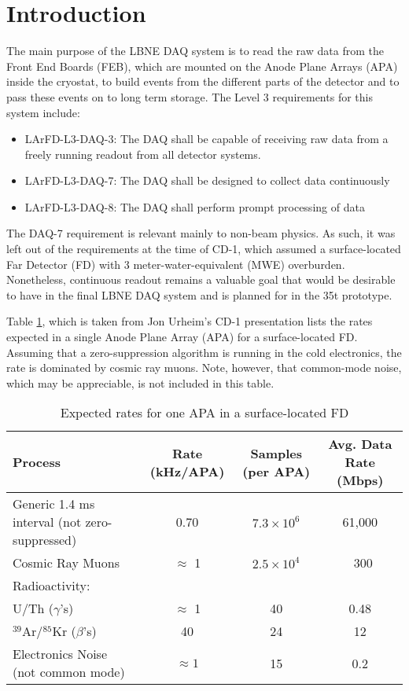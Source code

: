 \section{Introduction}

The main purpose of the LBNE DAQ system is to read the raw data from the 
Front End Boards (FEB), which are mounted on the Anode Plane Arrays (APA) inside
the cryostat, to build events from the different parts
of the detector and to pass these events on to long term storage.
The Level 3 requirements for this system include\cite{DAQ_REQ}:

\begin{itemize}
\item{LArFD-L3-DAQ-3: The DAQ shall be capable of receiving raw data from a freely running readout from all detector systems.}
\item{LArFD-L3-DAQ-7: The DAQ shall be designed to collect data continuously}
\item{LArFD-L3-DAQ-8: The DAQ shall perform prompt processing of data}
\end{itemize}
The DAQ-7 requirement is relevant mainly to non-beam physics. 
As such, it was left out of the requirements at the time of CD-1, which 
assumed a surface-located Far Detector (FD) with 3 meter-water-equivalent (MWE)
overburden. 
Nonetheless, continuous readout remains a valuable goal that would be desirable 
to have in the final LBNE DAQ system and is planned for in the 35t prototype.

Table \ref{tab:rates}, which is taken from Jon Urheim's CD-1 presentation
\cite{DAQ_CD1}
lists
the rates expected in a single Anode Plane Array (APA) for a surface-located
FD.
Assuming that a zero-suppression
algorithm is running in the cold electronics,
the rate is dominated by cosmic ray muons.
Note, however, that common-mode noise,
which may be appreciable,
is not included in this table.

\begin{table}[h]
\begin{tabular}{|p{1.5in}|c|c|c|}
\hline
Process&Rate (kHz/APA)& Samples (per APA) & Avg. Data Rate (Mbps)\\
\hline
Generic 1.4 ms interval (not zero-suppressed)&
0.70&$7.3 \times 10^6$& 61,000\\
\hline
Cosmic Ray Muons & $\approx$ 1 & $2.5 \times 10^4$ & ~300 \\
\hline
Radioactivity: &&& \\
U/Th ($\gamma$'s) & $\approx$ 1&40& 0.48\\
$^{39}$Ar/$^{85}$Kr ($\beta$'s)&40&24&12\\
\hline
Electronics Noise (not common mode) & $\approx 1$ & 15 & 0.2\\
\hline
\end{tabular}
\caption{\label{tab:rates} Expected rates for one APA in a surface-located
FD}
\end{table}

